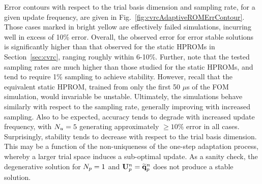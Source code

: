 Error contours with respect to the trial basis dimension and sampling rate, for a given update frequency, are given in Fig.~\ref{fig:cvrcAdaptiveROMErrContour}. Those cases marked in bright yellow are effectively failed simulations, incurring well in excess of 10\% error. Overall, the observed error for error stable solutions is significantly higher than that observed for the static HPROMs in Section~\ref{sec:cvrc}, ranging roughly within 6-10\%. Further, note that the tested sampling rates are much higher than those studied for the static HPROMs, and tend to require 1\% sampling to achieve stability. However, recall that the equivalent static HPROM, trained from only the first 50 $\mu$s of the FOM simulation, would invariable be unstable. Ultimately, the simulations behave similarly with respect to the sampling rate, generally improving with increased sampling. Also to be expected, accuracy tends to degrade with increased update frequency, with $N_u = 5$ generating approximately $\ge 10\%$ error in all cases. Surprisingly, stability tends to decrease with respect to the trial basis dimension. This may be a function of the non-uniqueness of the one-step adaptation process, whereby a larger trial space induces a sub-optimal update. As a sanity check, the degenerative solution for $N_p = 1$ and $\primTrial^{\timeIdx} = \primVecRom^{\timeIdx}$ does not produce a stable solution.


